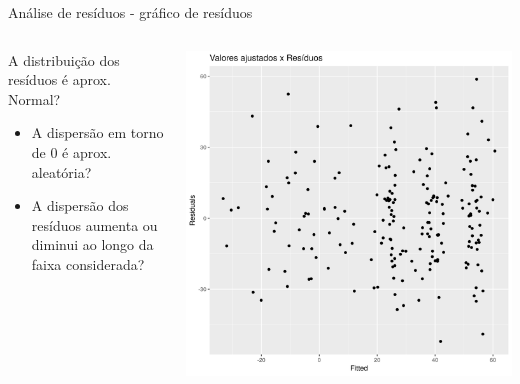 \documentclass{beamer}
\begin{document}
\begin{frame}{\footnotesize Análise de resíduos - gráfico de resíduos}
  \begin{columns}
    \begin{column}{5cm}
      A distribuição dos resíduos é aprox. Normal?
      \bigskip
      \begin{itemize}
        \footnotesize
      \item A dispersão em torno de 0 é aprox. aleatória?
        \bigskip
      \item A dispersão dos resíduos aumenta ou diminui ao longo da faixa considerada?
      \end{itemize}
    \end{column}
    \begin{column}{5cm}
      \begin{center}
        \includegraphics[width=1.1\textwidth]{Cap18-19/pratica-plot-resid}
      \end{center}
    \end{column}
  \end{columns}
\end{frame}
\end{document}
